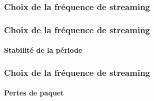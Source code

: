 \begin{frame}
 \frametitle{Choix de la fréquence de streaming}
 
\end{frame}

\begin{frame}
 \frametitle{Choix de la fréquence de streaming}
 \framesubtitle{Stabilité de la période}
 
\end{frame}

\begin{frame}
 \frametitle{Choix de la fréquence de streaming}
 \framesubtitle{Pertes de paquet}
 
\end{frame}
